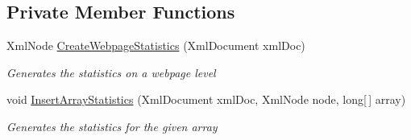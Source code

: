 \subsection*{Private Member Functions}
\begin{DoxyCompactItemize}
\item 
Xml\+Node \hyperlink{class_web_analyzer_1_1_models_1_1_data_model_1_1_webpage_model_af8b9bb060e28384f7ecf0635856187d4}{Create\+Webpage\+Statistics} (Xml\+Document xml\+Doc)
\begin{DoxyCompactList}\small\item\em Generates the statistics on a webpage level \end{DoxyCompactList}\item 
void \hyperlink{class_web_analyzer_1_1_models_1_1_data_model_1_1_webpage_model_a52e372578a17a8174ba376ca4d699b31}{Insert\+Array\+Statistics} (Xml\+Document xml\+Doc, Xml\+Node node, long\mbox{[}$\,$\mbox{]} array)
\begin{DoxyCompactList}\small\item\em Generates the statistics for the given array \end{DoxyCompactList}\end{DoxyCompactItemize}
